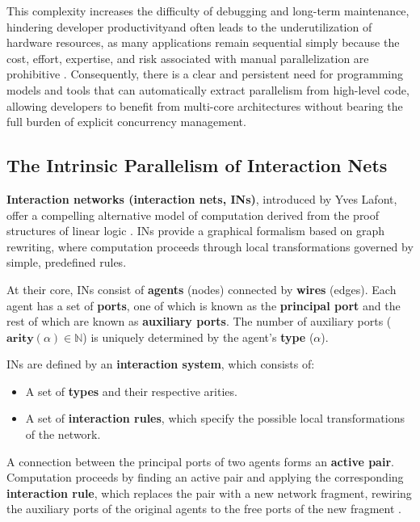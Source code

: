 This complexity increases the difficulty of debugging and long-term maintenance, hindering developer productivityand often leads to the underutilization of hardware resources, as many applications remain sequential simply because the cost, effort, expertise, and risk associated with manual parallelization are prohibitive \cite{Berzal2013}. Consequently, there is a clear and persistent need for programming models and tools that can automatically extract parallelism from high-level code, allowing developers to benefit from multi-core architectures without bearing the full burden of explicit concurrency management.

\subsection{The Intrinsic Parallelism of Interaction Nets}

\textbf{Interaction networks (interaction nets, INs)}, introduced by Yves Lafont, offer a compelling alternative model of computation derived from the proof structures of linear logic \cite{lafont1990interactionnets}. INs provide a graphical formalism based on graph rewriting, where computation proceeds through local transformations governed by simple, predefined rules. 

At their core, INs consist of \textbf{agents} (nodes) connected by \textbf{wires} (edges). Each agent has a set of \textbf{ports}, one of which is known as the \textbf{principal port} and the rest of which are known as \textbf{auxiliary ports}. The number of auxiliary ports (\(\textbf{arity}(\alpha) \in \mathbb{N}\)) is uniquely determined by the agent's \textbf{type} (\(\alpha\)).


INs are defined by an \textbf{interaction system}, which consists of:

\begin{itemize}
    \item A set of \textbf{types} and their respective arities.
    \item A set of \textbf{interaction rules}, which specify the possible local transformations of the network.
\end{itemize}

A connection between the principal ports of two agents forms an \textbf{active pair}. Computation proceeds by finding an active pair and applying the corresponding \textbf{interaction rule}, which replaces the pair with a new network fragment, rewiring the auxiliary ports of the original agents to the free ports of the new fragment \cite{lafont1990interactionnets}.



